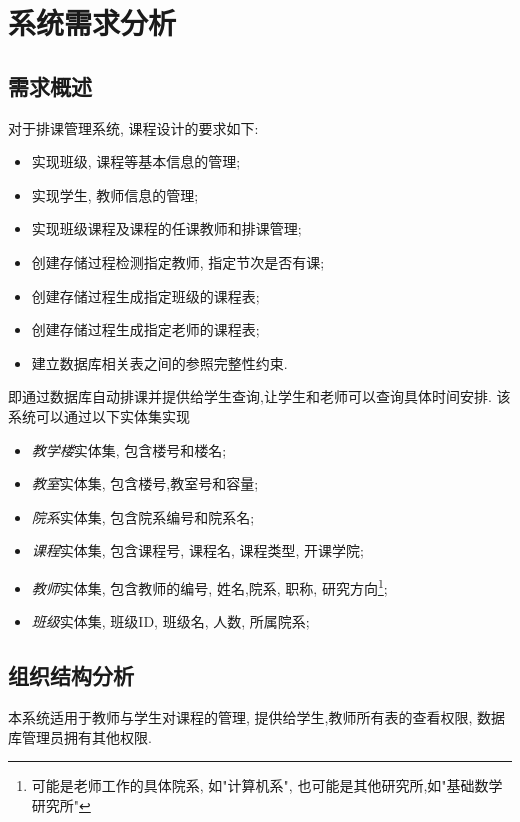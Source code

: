 \documentclass{myreport}
\begin{document}
\maketitle

\newpage
\tableofcontents
\newpage

\section{系统需求分析}
  \subsection{需求概述}
    对于排课管理系统, 课程设计的要求如下:
    \begin{itemize}
      \item 实现班级, 课程等基本信息的管理;
      \item 实现学生, 教师信息的管理;
      \item 实现班级课程及课程的任课教师和排课管理;
      \item 创建存储过程检测指定教师, 指定节次是否有课;
      \item 创建存储过程生成指定班级的课程表;
      \item 创建存储过程生成指定老师的课程表;
      \item 建立数据库相关表之间的参照完整性约束.
    \end{itemize}

    即通过数据库自动排课并提供给学生查询,让学生和老师可以查询具体时间安排.
    该系统可以通过以下实体集实现
    \begin{itemize}
      \item \emph{教学楼}实体集, 包含楼号和楼名;
      \item \emph{教室}实体集, 包含楼号,教室号和容量;
      \item \emph{院系}实体集, 包含院系编号和院系名;
      \item \emph{课程}实体集, 包含课程号, 课程名, 课程类型, 开课学院;
      \item \emph{教师}实体集, 包含教师的编号, 姓名,院系, 职称, 研究方向\footnote{可能是老师工作的具体院系, 如"计算机系", 也可能是其他研究所,如"基础数学研究所"};
      \item \emph{班级}实体集, 班级ID, 班级名, 人数, 所属院系;

    \end{itemize}

  \subsection{组织结构分析}
    本系统适用于教师与学生对课程的管理, 提供给学生,教师所有表的查看权限, 数据库管理员拥有其他权限.
\end{document}
